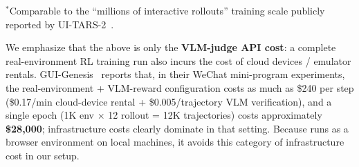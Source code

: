 \begin{table}[!htbp]
  \centering\small
  \setlength{\tabcolsep}{3pt}
  \caption{Cumulative cost at large-scale RL training if a VLM judge were used}
  \label{tab:cost-scale}
\end{table}

$^*$Comparable to the ``millions of interactive rollouts'' training scale publicly reported by UI-TARS-2~\cite{UITARS2}.

We emphasize that the above is only the \textbf{VLM-judge API cost}: a complete real-environment RL training run also incurs the cost of cloud devices / emulator rentals. GUI-Genesis~\cite{GUI-GENESIS} reports that, in their WeChat mini-program experiments, the real-environment + VLM-reward configuration costs as much as \$240 per step (\$0.17/min cloud-device rental + \$0.005/trajectory VLM verification), and a single epoch (1K env $\times$ 12 rollout = 12K trajectories) costs approximately \textbf{\$28,000}; infrastructure costs clearly dominate in that setting. Because \sys{} runs as a browser environment on local machines, it avoids this category of infrastructure cost in our setup.
